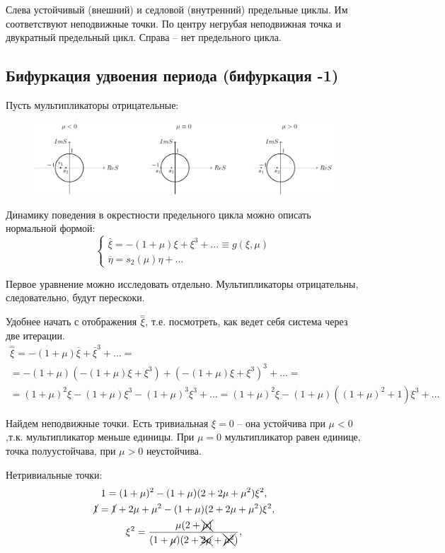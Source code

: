 Слева устойчивый (внешний) и седловой (внутренний) предельные циклы. Им соответствуют неподвижные точки. По центру негрубая неподвижная точка и двукратный предельный цикл. Справа -- нет предельного цикла.

\subsection{Бифуркация удвоения периода (бифуркация -1)}
Пусть мультипликаторы отрицательные:
\begin{figure}[H]
	\centering
	\includegraphics[width=1\linewidth]{fig/fig67.pdf}   
\end{figure}

Динамику поведения в окрестности предельного цикла можно описать нормальной формой:
\begin{equation}
	\begin{cases}
		\stackrel{\_}{\xi}= -(1+\mu)\xi+\xi^3+\dots \equiv g(\xi,\mu)\\
		\stackrel{\_}{\eta}= s_2(\mu)\eta+\dots
	\end{cases}
	\label{eq:110}	
\end{equation}

Первое уравнение можно исследовать отдельно. Мультипликаторы отрицательны, следовательно, будут перескоки. 

Удобнее начать с отображения $\stackrel{=}{\xi}$, т.е. посмотреть, как ведет себя система через две итерации.
\begin{gather*}
	\stackrel{=}{\xi}=-(1+\mu)\stackrel{\_}{\xi}+\stackrel{\_}{\xi}^3+\dots= \\
	=-(1+\mu)(-(1+\mu)\xi+\xi^3)+(-(1+\mu)\xi+\xi^3)^3+\dots= \\
	=(1+\mu)^2\xi-(1+\mu)\xi^3-(1+\mu)^3\xi^3+\dots=(1+\mu)^2\xi-(1+\mu)((1+\mu)^2+1)\xi^3+\dots
\end{gather*}

Найдем неподвижные точки. Есть тривиальная $\xi=0$ -- она устойчива при $\mu<0$,т.к. мультипликатор меньше единицы. При $\mu=0$ мультипликатор равен единице, точка полуустойчава, при $\mu>0$ неустойчива.

Нетривиальные точки:
\begin{gather*}
	1=(1+\mu)^2-(1+\mu)(2+2\mu+\mu^2)\xi^2, \\
	\cancel{1}=\cancel{1} +2\mu+\mu^2-(1+\mu)(2+2\mu+\mu^2)\xi^2, \\
	\xi^2=\frac{\mu(2+\xcancel{\mu)}}{(1+\cancel{\mu})(2+\xcancel{2\mu}+\xcancel{\mu^2})},
\end{gather*}

